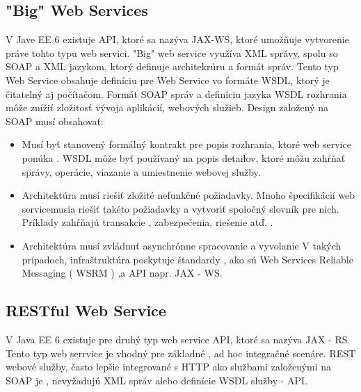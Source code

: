\subsection{"Big" Web Services}
V Jave EE 6 existuje API, ktoré sa nazýva JAX-WS, ktoré umožňuje vytvorenie práve tohto typu web servici.\cite{fitWeb} "Big" web service využíva XML správy, spolu so SOAP a XML jazykom, ktorý definuje architekrúru a formát správ. Tento typ Web Service obsahuje definíciu pre Web Service vo formáte WSDL, ktorý je čitatelný aj počítačom. Formát SOAP správ a definíciu jazyka WSDL rozhrania môže znížiť zložitosť vývoja aplikácií, webových služieb. Design založený na SOAP musí obsahovať:
\begin{itemize}


\item    Musí byť stanovený formálný kontrakt pre popis rozhrania, ktoré web service ponúka . WSDL môže byť používaný na popis detailov, ktoré môžu zahŕňať správy, operácie, viazanie a umiestnenie webovej služby. 

\item    Architektúra musí riešiť zložité nefunkčné požiadavky. Mnoho špecifikácií web servicemusia riešiť takéto požiadavky a vytvoriť spoločný slovník pre nich. Príklady zahŕňajú transakcie , zabezpečenia, riešenie atď. .

\item    Architektúra musí zvládnuť asynchrónne spracovanie a vyvolanie  V takých prípadoch, infraštruktúra poskytuje štandardy , ako sú Web Services Reliable Messaging ( WSRM ) ,a API napr. JAX - WS.

\end{itemize}


\subsection{RESTful Web Service}
V Java EE 6 existuje pre druhý typ web service API, ktoré sa nazýva JAX - RS. Tento typ web serrvice je vhodný pre základné , ad hoc integračné scenáre. REST webové služby, často lepšie integrované s HTTP ako službami založenými na SOAP je , nevyžadujú XML správ alebo definície WSDL služby - API.

